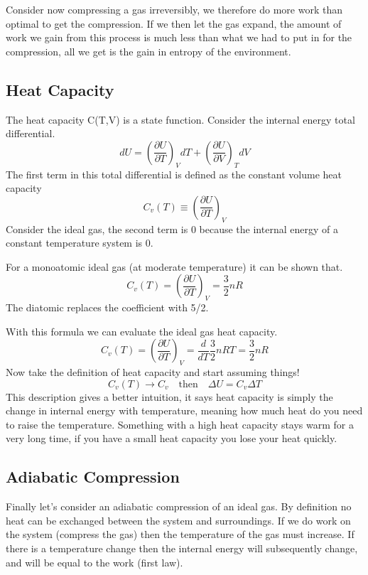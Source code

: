 \documentclass{article}
\begin{document}
Consider now compressing a gas irreversibly, we therefore do more work than optimal to get the compression. 
If we then let the gas expand, the amount of work we gain from this process is much less than what we had to put in for the compression, all we get is the gain in entropy of the environment. 

\subsection*{Heat Capacity}
The heat capacity C(T,V) is a state function. 
Consider the internal energy total differential.
\begin{equation}
dU = \left(\frac{\partial U}{\partial T}\right)_VdT + \left(\frac{\partial U}{\partial V}\right)_TdV
\end{equation}
The first term in this total differential is defined as the constant volume heat capacity
\begin{equation}
C_v(T) \equiv \left(\frac{\partial U}{\partial T}\right)_V
\end{equation}
Consider the ideal gas, the second term is 0 because the internal energy of a constant temperature system is 0. 

For a monoatomic ideal gas (at moderate temperature) it can be shown that. 
\begin{equation}
C_v(T) = \left(\frac{\partial U}{\partial T}\right)_V = \frac{3}{2}nR
\end{equation}
The diatomic replaces the coefficient with 5/2. 

With this formula we can evaluate the ideal gas heat capacity. 
\begin{equation}
C_v(T) = \left(\frac{\partial U}{\partial T}\right)_V = \frac{d}{dT} \frac{3}{2}nRT =  \frac{3}{2}nR
\end{equation}
Now take the definition of heat capacity and start assuming things!
\begin{equation}
C_v(T) \rightarrow C_v \quad \text{then} \quad \Delta U = C_v\Delta T
\end{equation}
This description gives a better intuition, it says heat capacity is simply the change in internal energy with temperature, meaning how much heat do you need to raise the temperature. 
Something with a high heat capacity stays warm for a very long time, if you have a small heat capacity you lose your heat quickly. 

\subsection*{Adiabatic Compression}
Finally let's consider an adiabatic compression of an ideal gas. 
By definition no heat can be exchanged between the system and surroundings. 
If we do work on the system (compress the gas) then the temperature of the gas must increase. 
If there is a temperature change then the internal energy will subsequently change, and will be equal to the work (first law). 
\end{document}
